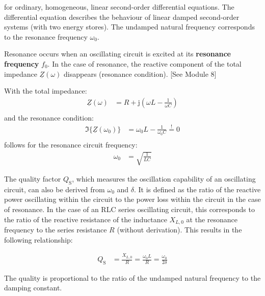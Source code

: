 \begin{frame}[t]
{    for ordinary, homogeneous, linear second-order differential equations.
    The differential equation describes the behaviour of linear damped second-order systems (with two energy stores).
    The undamped natural frequency corresponds to the resonance frequency $\omega_0$.
        
    Resonance occurs when an oscillating circuit is excited at its \textbf{resonance frequency} $f_0$.
    In the case of resonance, the reactive component of the total impedance $\underline{Z}(\omega)$ disappears (resonance condition). [See Module 8]

    With the total impedance:
    \begin{align}
            \underline{Z}(\omega) &= R + \mathrm{j} \left( \omega L - \frac{1}{\omega C} \right) \nonumber\\
    \end{align}
    and the resonance condition:
    \begin{align}
            \Im\{\underline{Z}(\omega_0)\} &= \omega_0 L - \frac{1}{\omega_0 C} \overset{!}{=} 0 \nonumber\\
    \end{align}
    follows for the resonance circuit frequency:
    \begin{align}
            \omega_0 &= \sqrt{\frac{1}{LC}} \label{eq:dgl:rlc:resonanzkreisfrequenz}
    \end{align}

    The quality factor $Q_{\mathrm{S}}$, which measures the oscillation capability of an oscillating circuit, can also be derived from $\omega_0$ and $\delta$.
    It is defined as the ratio of the reactive power oscillating within the circuit
    to the power loss within the circuit in the case of resonance. In the case of an RLC series oscillating circuit, this corresponds to the ratio of
    the reactive resistance of the inductance $X_{L,0}$ at the resonance frequency to the series resistance $R$ (without derivation).
    This results in the following relationship:

    \begin{align}
        Q_{\mathrm{S}} &= \frac{X_{L,0}}{R} = \frac{\omega_0 L}{R} = \frac{\omega_0}{2\delta} \label{eq:dgl:rlc:guete}
    \end{align}

    The quality is proportional to the ratio of the undamped natural frequency to the damping constant. %

}
\end{frame}
